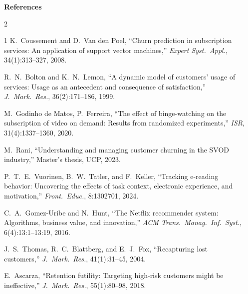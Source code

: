 \documentclass[final]{beamer}
\newlength{\sepwidth}
\newlength{\colwidth}
\newcommand{\separatorcolumn}{\begin{column}{\sepwidth}\end{column}}
\begin{document}
\begin{frame}[t]
\begin{columns}[t]
\begin{column}{\colwidth}
\begin{block}{\textbf{References}}
\vspace{-1em}
\fontsize{14}{17}\selectfont
\begin{multicols}{2}
\begin{thebibliography}{1}
\justifying
\setlength{\itemsep}{0pt}\setlength{\parskip}{0pt}
K.~Coussement and D.~Van den Poel, ``Churn prediction in subscription services: An application of support vector machines,'' \emph{Expert Syst.\ Appl.}, 34(1):313--327, 2008.

R.~N.~Bolton and K.~N.~Lemon, ``A dynamic model of customers' usage of services: Usage as an antecedent and consequence of satisfaction,'' \emph{J.~Mark.~Res.}, 36(2):171--186, 1999.

M.~Godinho de Matos, P.~Ferreira, ``The effect of binge-watching on the subscription of video on demand: Results from randomized experiments,'' \emph{ISR}, 31(4):1337--1360, 2020.

M.~Rani, ``Understanding and managing customer churning in the SVOD industry,'' Master's thesis, UCP, 2023.

P.~T.~E.~Vuorinen, B.~W.~Tatler, and F.~Keller, ``Tracking e-reading behavior: Uncovering the effects of task context, electronic experience, and motivation,'' \emph{Front.~Educ.}, 8:1302701, 2024.

C.~A.~Gomez-Uribe and N.~Hunt, ``The Netflix recommender system: Algorithms, business value, and innovation,'' \emph{ACM Trans.~Manag.~Inf.~Syst.}, 6(4):13:1--13:19, 2016.

J.~S.~Thomas, R.~C.~Blattberg, and E.~J.~Fox, ``Recapturing lost customers,'' \emph{J.~Mark.~Res.}, 41(1):31--45, 2004.

E.~Ascarza, ``Retention futility: Targeting high-risk customers might be ineffective,'' \emph{J.~Mark.~Res.}, 55(1):80--98, 2018.

\end{thebibliography}
\end{multicols}

\end{block}

\end{column}
\separatorcolumn



\end{columns}
\end{frame}
\end{document}
